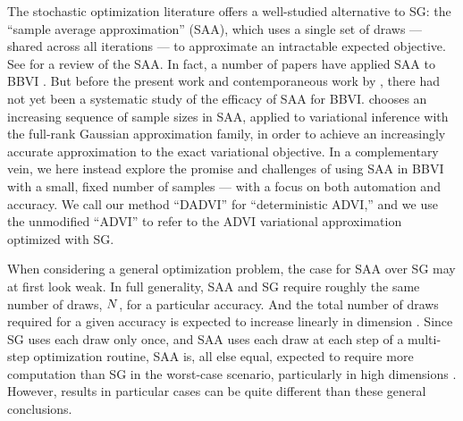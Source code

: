 The stochastic optimization literature offers a well-studied alternative to SG:
the ``sample average approximation'' (SAA), which uses a single set of draws ---
shared across all iterations --- to approximate an intractable expected
objective. See \citet{kim:2015:guidetosaa} for a review of the SAA. In fact, a
number of papers have applied SAA to BBVI
\citep{giordano:2018:covariances,domke:2018:importanceweightingvi,domke:2019:divideandcouplevi,
broderick:2020:automatic,wycoff:2022:sparsebayesianlasso,giordano:2023:bnp}. But
before the present work and contemporaneous work by
\citet{burroni:2023:saabbvi}, there had not yet been a systematic study of the
efficacy of SAA for BBVI. \cite{burroni:2023:saabbvi} chooses an increasing
sequence of sample sizes in SAA, applied to variational inference with the
full-rank Gaussian approximation family, in order to achieve an increasingly
accurate approximation to the exact variational objective. In a complementary
vein, we here instead explore the promise and challenges of using SAA in BBVI
with a small, fixed number of samples --- with a focus on both automation and
accuracy. We call our method ``DADVI'' for ``deterministic ADVI,'' and we use
the unmodified ``ADVI'' to refer to the ADVI variational approximation optimized
with SG.

When considering a general optimization problem, the case for SAA over SG may at
first look weak. In full generality, SAA and SG require roughly the same number
of draws, $N$, for a particular accuracy. And the total number of draws required for a
given accuracy is expected to increase linearly in dimension \citep[][Chapter
5]{nemirovski:2009:sgdvsfixed,shapiro:2021:lectures}. Since SG uses each draw
only once, and SAA uses each draw at each step of a multi-step optimization
routine, SAA is, all else equal, expected to require more computation than SG in
the worst-case scenario, particularly in high dimensions
\citep{royset:2013:optimalsaa, kim:2015:guidetosaa}.  However, results in
particular cases can be quite different than these general conclusions.

